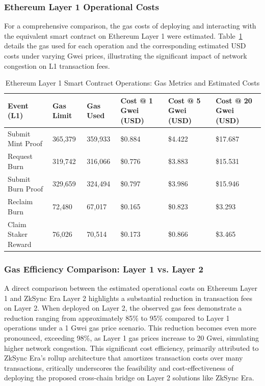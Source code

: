 \documentclass{DESSThesis}
\begin{document}
\subsubsection{Ethereum Layer 1 Operational Costs}
For a comprehensive comparison, the gas costs of deploying and interacting with the equivalent smart contract on Ethereum Layer 1 were estimated. Table~\ref{tab:l1_gas_metrics} details the gas used for each operation and the corresponding estimated USD costs under varying Gwei prices, illustrating the significant impact of network congestion on L1 transaction fees.

\begin{table}[h!]
\caption{Ethereum Layer 1 Smart Contract Operations: Gas Metrics and Estimated Costs}
\label{tab:l1_gas_metrics}
\centering
\begin{tabularx}{\textwidth}{|X|X|X|X|X|X|} %
\hline
\textbf{Event (L1)} & \textbf{Gas Limit} & \textbf{Gas Used} & \textbf{Cost @ 1 Gwei (USD)} & \textbf{Cost @ 5 Gwei (USD)} & \textbf{Cost @ 20 Gwei (USD)} \\
\hline
Submit Mint Proof & 365,379 & 359,933 & \$0.884 & \$4.422 & \$17.687 \\
\hline
Request Burn & 319,742 & 316,066 & \$0.776 & \$3.883 & \$15.531 \\
\hline
Submit Burn Proof & 329,659 & 324,494 & \$0.797 & \$3.986 & \$15.946 \\
\hline
Reclaim Burn & 72,480 & 67,017 & \$0.165 & \$0.823 & \$3.293 \\
\hline
Claim Staker Reward & 76,026 & 70,514 & \$0.173 & \$0.866 & \$3.465 \\
\hline
\end{tabularx}
\end{table}

\subsubsection{Gas Efficiency Comparison: Layer 1 vs. Layer 2}
A direct comparison between the estimated operational costs on Ethereum Layer 1 and ZkSync Era Layer 2 highlights a substantial reduction in transaction fees on Layer 2. When deployed on Layer 2, the observed gas fees demonstrate a reduction ranging from approximately 85\% to 95\% compared to Layer 1 operations under a 1 Gwei gas price scenario. This reduction becomes even more pronounced, exceeding 98\%, as Layer 1 gas prices increase to 20 Gwei, simulating higher network congestion. This significant cost efficiency, primarily attributed to ZkSync Era's rollup architecture that amortizes transaction costs over many transactions, critically underscores the feasibility and cost-effectiveness of deploying the proposed cross-chain bridge on Layer 2 solutions like ZkSync Era.
\end{document}
